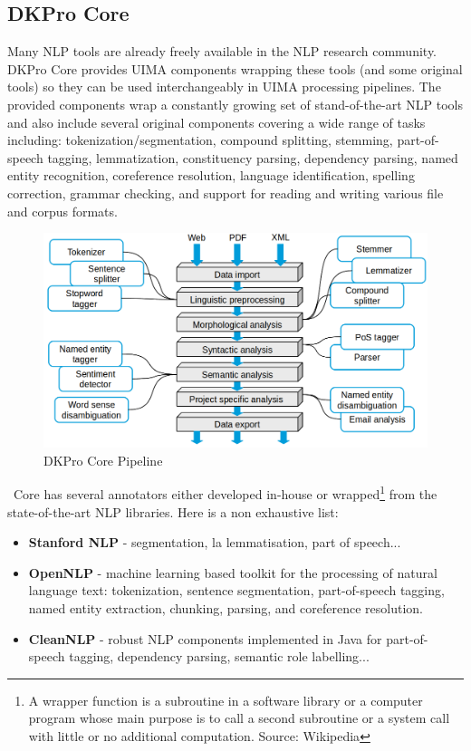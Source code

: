 \subsection{DKPro Core}
Many NLP tools are already freely available in the NLP research community. DKPro Core \cite{TUD-CS-2014-0864} provides UIMA components wrapping these tools (and some original tools) so they can be used interchangeably in UIMA processing pipelines. The provided components wrap a constantly growing set of stand-of-the-art NLP tools and also include several original components covering a wide range of tasks including: tokenization/segmentation, compound splitting, stemming, part-of-speech tagging, lemmatization, constituency parsing, dependency parsing, named entity recognition, coreference resolution, language identification, spelling correction, grammar checking, and support for reading and writing various file and corpus formats. 
\
\begin{figure}[H]
    \centering
    \includegraphics[width=1\textwidth]{fig/dkpro-pipeline.png}
    \caption[Short caption]{DKPro Core Pipeline}
    \label{fig:dkpro-pipeline}
\end{figure}
\
Core has several annotators either developed in-house or wrapped\footnote{A wrapper function is a subroutine in a software library or a computer program whose main purpose is to call a second subroutine or a system call with little or no additional computation. Source: Wikipedia} from the state-of-the-art NLP libraries. Here is a non exhaustive list:
\begin{itemize}
  \item \textbf{Stanford NLP} - segmentation, la lemmatisation, part of speech...
  \item \textbf{OpenNLP} - machine learning based toolkit for the processing of natural language text: tokenization, sentence segmentation, part-of-speech tagging, named entity extraction, chunking, parsing, and coreference resolution. 
  \item \textbf{CleanNLP} - robust NLP components implemented in Java for part-of-speech tagging, dependency parsing, semantic role labelling... 
\end{itemize}

